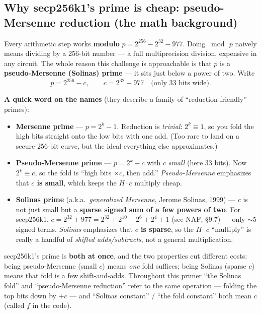 \documentclass[11pt,a4paper]{article}
\begin{document}
\subsection{Why secp256k1's prime is cheap: pseudo-Mersenne reduction (the math background)}
\label{sec:pmmath}

Every arithmetic step works \textbf{modulo} $p = 2^{256} - 2^{32} - 977$. Doing $\bmod\,p$ naively
means dividing by a 256-bit number --- a full multiprecision division, expensive in any circuit. The
whole reason this challenge is approachable is that $p$ is a \textbf{pseudo-Mersenne (Solinas) prime}
--- it sits just below a power of two. Write
\[
  p = 2^{256} - c, \qquad c = 2^{32} + 977 \quad\text{(only 33 bits wide)}.
\]

\textbf{A quick word on the names} (they describe a family of ``reduction-friendly'' primes):
\begin{itemize}
  \item \textbf{Mersenne prime} --- $p = 2^k - 1$. Reduction is \emph{trivial}: $2^k \equiv 1$, so you
    fold the high bits straight onto the low bits with one add. (Too rare to land on a secure 256-bit
    curve, but the ideal everything else approximates.)
  \item \textbf{Pseudo-Mersenne prime} --- $p = 2^k - c$ with $c$ \emph{small} (here 33 bits). Now
    $2^k \equiv c$, so the fold is ``high bits $\times c$, then add.'' \emph{Pseudo-Mersenne}
    emphasizes that \textbf{$c$ is small}, which keeps the $H\cdot c$ multiply cheap.
  \item \textbf{Solinas prime} (a.k.a.\ \emph{generalized Mersenne}, Jerome Solinas, 1999) --- $c$ is
    not just small but a \textbf{sparse signed sum of a few powers of two}. For secp256k1,
    $c = 2^{32} + 977 = 2^{32} + 2^{10} - 2^{6} + 2^{4} + 1$ (see NAF, \S9.7) --- only $\sim$5 signed
    terms. \emph{Solinas} emphasizes that \textbf{$c$ is sparse}, so the $H\cdot c$ ``multiply'' is
    really a handful of \emph{shifted adds/subtracts}, not a general multiplication.
\end{itemize}
secp256k1's prime is \textbf{both at once}, and the two properties cut different costs: being
pseudo-Mersenne (small $c$) means \emph{one} fold suffices; being Solinas (sparse $c$) means that fold
is a few shift-and-adds. Throughout this primer ``the Solinas fold'' and ``pseudo-Mersenne
reduction'' refer to the same operation --- folding the top bits down by $+c$ --- and ``Solinas
constant'' / ``the fold constant'' both mean $c$ (called $f$ in the code).
\end{document}
